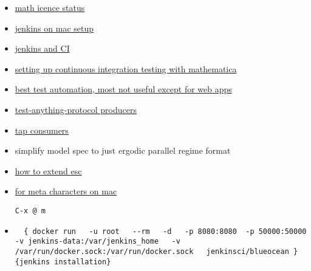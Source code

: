 \documentclass[hyperref]{labbook}
\begin{document}

\begin{itemize}
\item \href{ssh ublm1 /var/appl/matlmd/scripts/mathlm status}{math icence status}
\end{itemize}


\begin{itemize}
\item \href{https://www.blazemeter.com/blog/how-start-working-github-plugin-jenkins}{jenkins on mac setup}
\item \href{https://dev.to/iriskatastic/start-continuous-integration-with-jenkins-pipeline-4edb}{jenkins and CI}
\end{itemize}

\begin{itemize}
\item \href{https://mathematica.stackexchange.com/questions/163912/automating-testing-of-mathematica-code}{setting up continuous integration testing with mathematica}
\item \href{https://medium.com/@briananderson2209/best-automation-testing-tools-for-2018-top-10-reviews-8a4a19f664d2}{best test automation, most not useful except for web apps}
\item \href{https://testanything.org/producers.html}{test-anything-protocol producers}
\item \href{https://testanything.org/consumers.html}{tap consumers}
\end{itemize}


\begin{itemize}
\item simplify model spec to just ergodic parallel regime format
\end{itemize}


\begin{itemize}
\item \href{https://emacs.stackexchange.com/questions/3992/how-to-extend-the-esc-m-translation-to-non-character-keys}{how to extend esc}
\item \href{https://emacs.stackexchange.com/questions/3971/how-to-type-org-modes-m-bindings-in-emacs-for-mac}{for meta characters on mac}
\begin{verbatim}
C-x @ m
\end{verbatim}

\item
\begin{verbatim}
  { docker run   -u root   --rm   -d   -p 8080:8080  -p 50000:50000  -v jenkins-data:/var/jenkins_home   -v /var/run/docker.sock:/var/run/docker.sock   jenkinsci/blueocean }{jenkins installation}

\end{verbatim}
\end{itemize}
\end{document}
